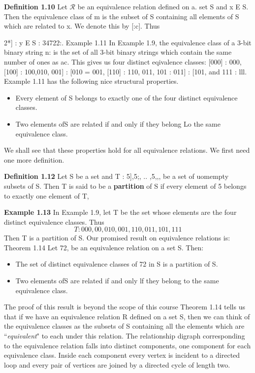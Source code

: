 \documentclass[]{article}
\begin{document}
\noindent \textbf{Definition 1.10} Let $\mathcal{R}$ be an equivalence relation defined on a. set S and x E S.
Then the equivalence class of m is the subset of S containing all elements of S
which are related to x. We denote this by [:c]. Thus
{2*] : {y E S : 34722:}.
Example 1.11 In Example 1.9, the equivalence class of a 3-bit binary string n: is
the set of all 3-bit binary strings which contain the same number of ones as ac. This
gives us four distinct eqivalence classes: [000] : {000}, [100] : {100,010, 001] :
[010} = {001}, [110] : {110, 011, 101} : {011] : [101}, and {111} : {lll}.
Example 1.11 has the following nice structural properties.

\begin{itemize}
\item Every element of S belongs to exactly one of the four distinct equivalence
classes.

\item Two elements ofS are related if and only if they belong Lo the same equivalence
class.
\end{itemize}
We shall see that these properties hold for all equivalence relations. We first need
one more definition.


\noindent \textbf{Definition 1.12} Let S be a set and T : {5],5;, .. ,5,,,} be a set of uomempty
subsets of S. Then T is said to be a \textbf{partition} of S if every element of 5 belongs
to exactly one element of T,


\noindent \textbf{Example 1.13} In Example 1.9, let T be the set whose elements are the four distinct
equivalence classes. Thus
\[T : {{000},{00,010,001},{110,011,101},{111}}\]
Then T is a partition of S.
Our promised result on equivalence relations is:
Theorem 1.14 Let 72, be an equivalence relation on a set S. Then:

\begin{itemize}
\item The set of distinct equivalence classes of 72 in S is a partition of S.
\item Two elements ofS are related if and only lf they belong to the same equivalence
class.
\end{itemize}
The proof of this result is beyond the scope of this course Theorem 1.14 tells us
that if we have an equivalence relation R defined on a set S, then we can think
of the equivalence classes as the subsets of S containing all the elements which are
“\textit{equivalent}" to each under this relation. 
The relationship digraph corresponding
to the equivalence relation falls into distinct components, one component for each
equivalence class. Inside each component every vertex is incident to a directed loop
and every pair of vertices are joined by a directed cycle of length two.
}
\end{document}
